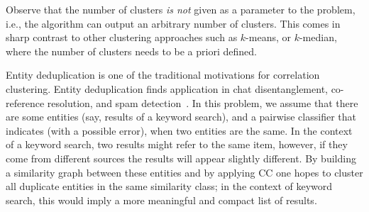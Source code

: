 \documentclass{article} %
\begin{document}
Observe that the number of clusters {\it is not} given as a parameter to the problem, i.e., the algorithm can output an arbitrary number of clusters.
This comes in sharp contrast to other clustering approaches such as $k$-means, or $k$-median, where the number of clusters needs to be a priori defined.

Entity deduplication is one of the traditional motivations for correlation clustering. 
Entity deduplication finds application in chat disentanglement, co-reference resolution, and spam detection~\cite{
elmagarmid2007duplicate,
arasu2009large,
elsner2009bounding,
hussain2013evaluation,
bonchi2014correlation,chierichetti2014correlation}.
In this problem, we assume that there are some entities (say, results of a keyword search), and a pairwise classifier that indicates (with a possible error), when two entities are the same.
In the context of a keyword search, two results might refer to the same item, however, if they come from different sources the results will appear slightly different.
By building a similarity graph between these entities and by applying CC one hopes to cluster all duplicate entities in the same similarity class; in the context of keyword search, this would imply a more meaningful and compact list of results.



\end{document}
